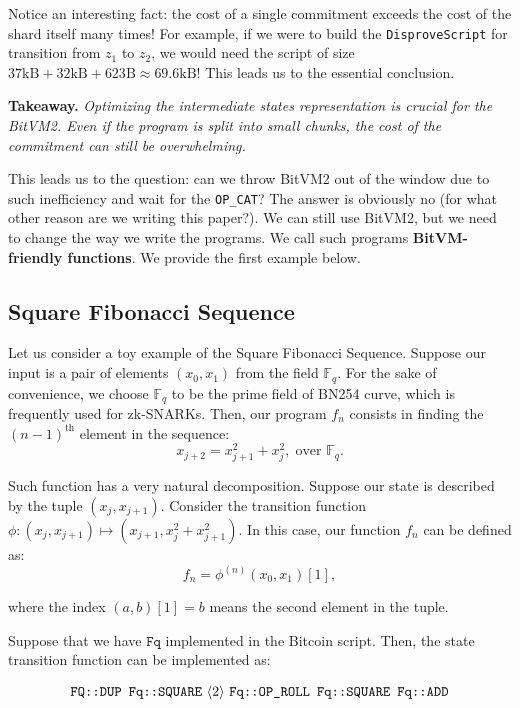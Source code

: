 \documentclass{iacrtrans}
\newcommand{\elem}[1]{\, \langle #1 \rangle \,}
\newcommand{\opcode}[1]{\, \texttt{#1} \,}
\begin{document}
Notice an interesting fact: the cost of a single commitment exceeds the cost of the shard itself many times! For example, if we were to build the \texttt{DisproveScript} for transition from $z_1$ to $z_2$, we would need the script of size $37\text{kB}+32\text{kB}+623\text{B} \approx 69.6\text{kB}$! This leads us to the essential conclusion.

\textbf{Takeaway.} \textit{Optimizing the intermediate states representation is crucial for the BitVM2. Even if the program is split into small chunks, the cost of the commitment can still be overwhelming.}

This leads us to the question: can we throw BitVM2 out of the window due to such inefficiency and wait for the \texttt{OP\_CAT}? The answer is obviously no (for what other reason are we writing this paper?). We can still use BitVM2, but we need to change the way we write the programs. We call such programs \textbf{BitVM-friendly functions}. We provide the first example below.

\subsection{Square Fibonacci Sequence}
Let us consider a toy example of the Square Fibonacci Sequence. Suppose our input is a pair of elements $(x_0,x_1)$ from the field $\mathbb{F}_q$. For the sake of convenience, we choose $\mathbb{F}_q$ to be the prime field of BN254 curve, which is frequently used for zk-SNARKs. Then, our program $f_n$ consists in finding the $(n-1)^{\text{th}}$ element in the sequence:
\begin{equation*}
  x_{j+2} = x_{j+1}^2 + x_j^2, \; \text{over $\mathbb{F}_q$.}
\end{equation*}

Such function has a very natural decomposition. Suppose our state is described by the tuple $(x_j,x_{j+1})$. Consider the transition function $\phi: (x_j, x_{j+1}) \mapsto (x_{j+1}, x_j^2 + x_{j+1}^2)$. In this case, our function $f_n$ can be defined as:
\begin{equation*}
  f_n = \phi^{(n)}(x_0,x_1)[1],
\end{equation*}

where the index $(a, b)[1] = b$ means the second element in the tuple.

Suppose that we have $\mathtt{Fq}$ implemented in the Bitcoin script. Then, the state transition function can be implemented as:
\begin{empheqboxed}
  \begin{align*}
    \opcode{\texttt{FQ::DUP}} \, \opcode{\texttt{Fq::SQUARE}} \elem{2} \opcode{\texttt{Fq::OP\_ROLL}} \, \opcode{\texttt{Fq::SQUARE}} \, \opcode{\texttt{Fq::ADD}}
  \end{align*}
\end{empheqboxed}
\end{document}
